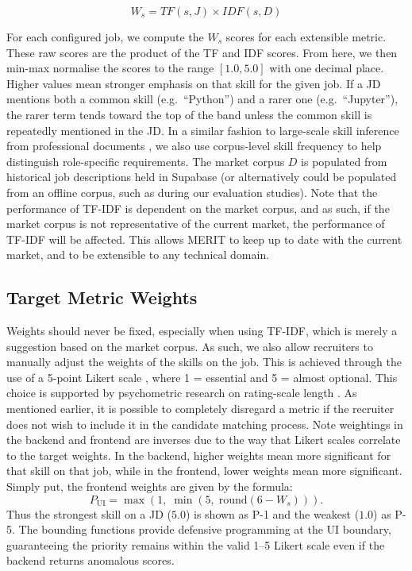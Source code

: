 \begin{equation}
    W_s = TF(s, J) \times IDF(s, D)
\end{equation}

For each configured job, we compute the $W_s$ scores for each extensible metric.
These raw scores are the product of the TF and IDF scores. From here, we then min-max normalise the scores to the range $[1.0, 5.0]$ 
with one decimal place. Higher values mean stronger emphasis on that skill for the given job. If a JD mentions both a common skill 
(e.g.\ ``Python'') and a rarer one (e.g.\ ``Jupyter''), 
the rarer term tends toward the top of the band unless the common skill is repeatedly mentioned in the JD. In a similar fashion to 
large-scale skill inference from professional documents \cite{bastian2014linkedin}, we also use corpus-level skill frequency to help 
distinguish role-specific requirements. The market corpus $D$ is populated from
historical job descriptions held in Supabase (or alternatively could be populated from an offline corpus, such as during our evaluation studies).
Note that the performance of TF-IDF is dependent on the market corpus, and as such, if the market corpus is not representative of 
the current market, the performance of TF-IDF will be affected. This allows MERIT to keep up to date with the current market, and to be 
extensible to any technical domain.


\subsection{Target Metric Weights}
Weights should never be fixed, especially when using TF-IDF, which is merely a suggestion based on the market corpus. As such, we also allow recruiters
to manually adjust the weights of the skills on the job. This is achieved through the use of a 5-point Likert scale \cite{likert1932technique}, where
1 = essential and 5 = almost optional. This choice is supported by psychometric research on rating-scale length 
\cite{lozano2008effect, coelho2007choice}. As mentioned earlier, it is possible to completely disregard a metric if the recruiter does 
not wish to include it in the candidate matching process. Note weightings in the backend and frontend are inverses
due to the way that Likert scales correlate to the target weights. In the backend, higher weights mean more significant
for that skill on that job, while in the frontend, lower weights mean more significant. Simply put, the frontend weights are given
by the formula:
\begin{equation}
    P_{\text{UI}} = \max\left(1,\; \min\left(5,\; \mathrm{round}(6 - W_s)\right)\right).
\end{equation}
Thus the strongest skill on a JD ($5.0$) is shown as P-1 and the weakest ($1.0$) as P-5. The bounding functions provide defensive 
programming at the UI boundary, guaranteeing the priority remains within the valid 1--5 Likert scale even if the backend returns anomalous scores.

